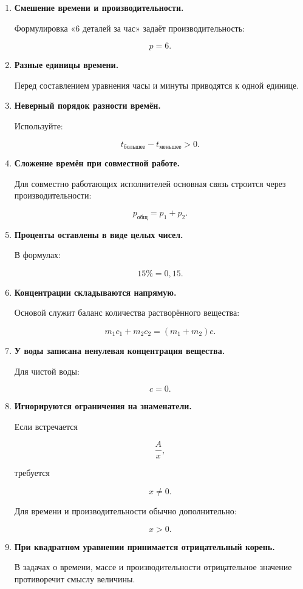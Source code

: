 \documentclass[a4paper,12pt]{article}
\begin{document}
\begin{enumerate}
    \item \textbf{Смешение времени и производительности.}

    Формулировка «6 деталей за час» задаёт производительность:

    \[
    p=6.
    \]

    \item \textbf{Разные единицы времени.}

    Перед составлением уравнения часы и минуты приводятся к одной единице.

    \item \textbf{Неверный порядок разности времён.}

    Используйте:

    \[
    t_{\text{большее}}-t_{\text{меньшее}}>0.
    \]

    \item \textbf{Сложение времён при совместной работе.}

    Для совместно работающих исполнителей основная связь строится через производительности:

    \[
    p_{\text{общ}}=p_1+p_2.
    \]

    \item \textbf{Проценты оставлены в виде целых чисел.}

    В формулах:

    \[
    15\%=0{,}15.
    \]

    \item \textbf{Концентрации складываются напрямую.}

    Основой служит баланс количества растворённого вещества:

    \[
    m_1c_1+m_2c_2=(m_1+m_2)c.
    \]

    \item \textbf{У воды записана ненулевая концентрация вещества.}

    Для чистой воды:

    \[
    c=0.
    \]

    \item \textbf{Игнорируются ограничения на знаменатели.}

    Если встречается

    \[
    \frac{A}{x},
    \]

    требуется

    \[
    x\ne0.
    \]

    Для времени и производительности обычно дополнительно:

    \[
    x>0.
    \]

    \item \textbf{При квадратном уравнении принимается отрицательный корень.}

    В задачах о времени, массе и производительности отрицательное значение противоречит смыслу величины.
\end{enumerate}
\end{document}
